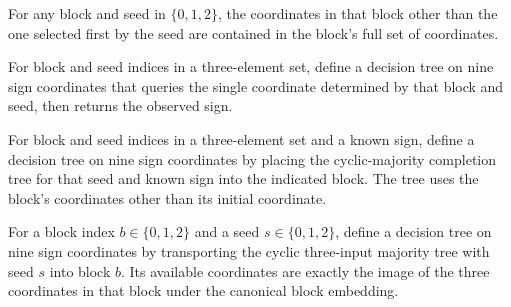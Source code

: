 \begin{theorem}
\label{FABL.depthTwoRemaining_subset_block}
\leanok
{}
For any block and seed in $\{0,1,2\}$, the coordinates in that block other than the one
selected first by the seed are contained in the block's full set of coordinates.
\end{theorem}

\begin{definition}
\label{FABL.depthTwoInitialTree}
\leanok
{}
For block and seed indices in a three-element set, define a decision tree on nine sign
coordinates that queries the single coordinate determined by that block and seed, then
returns the observed sign.
\end{definition}

\begin{definition}
\label{FABL.depthTwoCompletionTree}
\leanok
{}
For block and seed indices in a three-element set and a known sign, define a decision
tree on nine sign coordinates by placing the cyclic-majority completion tree for that
seed and known sign into the indicated block. The tree uses the block's coordinates
other than its initial coordinate.
\end{definition}

\begin{definition}
\label{FABL.depthTwoEvaluationTree}
\leanok
{}
For a block index $b\in\{0,1,2\}$ and a seed $s\in\{0,1,2\}$, define a decision tree on
nine sign coordinates by transporting the cyclic three-input majority tree with seed $s$
into block $b$. Its available coordinates are exactly the image of the three coordinates
in that block under the canonical block embedding.
\end{definition}

